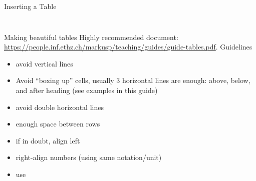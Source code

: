 \begin{frame}[fragile]{Inserting a Table}
\begin{columns}[t]
\begin{column}{.5\textwidth}
\begin{figure}
			\end{figure}
		\end{column}
	\end{columns}	
\end{frame}



\begin{frame}[fragile]{Making beautiful tables}
	Highly recommended document: \url{https://people.inf.ethz.ch/markusp/teaching/guides/guide-tables.pdf}.
	\somespace
    Guidelines
	\begin{itemize}
		\item avoid vertical lines
        \item Avoid “boxing up” cells, usually 3 horizontal lines are
enough: above, below, and after heading (see examples in
this guide)
\item avoid double horizontal lines
\item enough space between rows
\item if in doubt, align left
\item right-align numbers (using same notation/unit)
        \item use 
	\end{itemize}
\end{frame}


